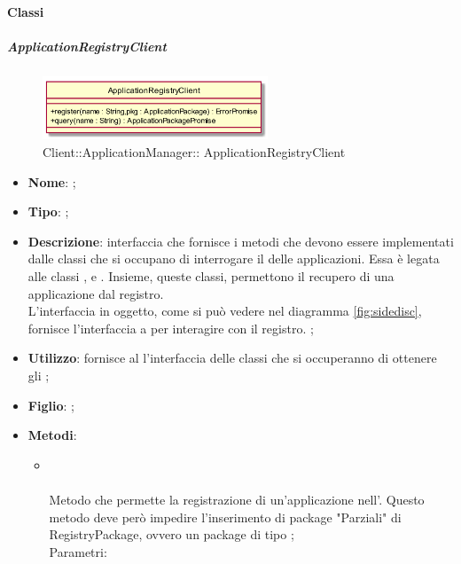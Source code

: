 \paragraph{Classi}
\hypertarget{ ApplicationRegistryClient_label}{\subparagraph{ ApplicationRegistryClient}}
\begin{figure}[h]
	\centering
	\includegraphics[width=0.60\textwidth,height=\textheight,keepaspectratio]{images/ClassApplicationRegistryClient.png}
	\caption{Client::ApplicationManager:: ApplicationRegistryClient}
\end{figure}
\begin{itemize}
	\item \textbf{Nome}: ;
	\item \textbf{Tipo}: ;
	\item \textbf{Descrizione}: interfaccia che fornisce i metodi che devono essere implementati dalle classi che si occupano di interrogare il  delle applicazioni.
Essa è legata alle classi ,  e . Insieme, queste classi, permettono il recupero di una applicazione dal registro. \\
L'interfaccia in oggetto, come si può vedere nel diagramma \ref{fig:sidedisc}, fornisce l'interfaccia a  per interagire con il registro.
;
	\item \textbf{Utilizzo}: fornisce al  l'interfaccia delle classi che si occuperanno di ottenere gli ;
	\item \textbf{Figlio}: ;
	\item \textbf{Metodi}:
	\begin{itemize}
		\item[]  \\\\		Metodo che permette la registrazione di un'applicazione nell'. Questo metodo deve però impedire l'inserimento di package "Parziali" di RegistryPackage, ovvero un package di tipo ;\\
		Parametri:
		\begin{itemize}

\end{itemize}
\end{itemize}
\end{itemize}
